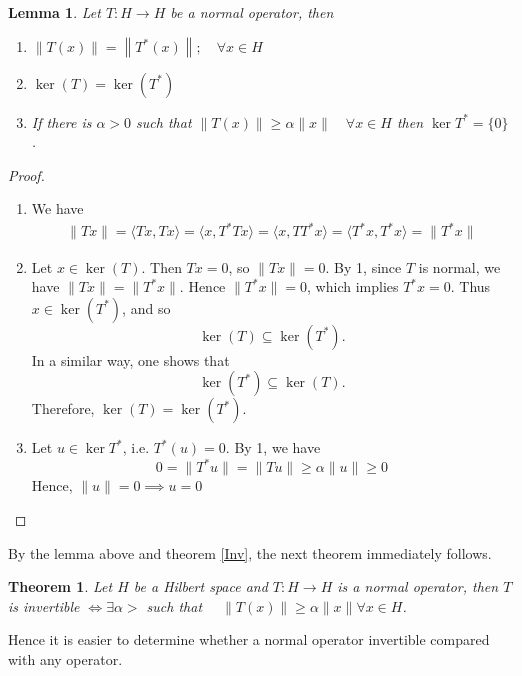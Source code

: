 \documentclass{report}
\newtheorem{thm}{Theorem}
\newtheorem{lem}{Lemma}
\begin{document}
\begin{lem}
Let $T: H \rightarrow H$ be a normal operator, then
  \begin{enumerate}
    \item $\|T(x)\|=\left\|T^{*}(x)\right\| ; \quad \forall x \in H$
    \item $\ker(T)=\ker(T^*)$
    \item If there is $\alpha>0$ such that $\|T(x)\| \geqslant \alpha\|x\| \quad \forall x \in H$ then $\operatorname{ker} T^{*}=\{0\}$.
  \end{enumerate}
\end{lem}
\begin{proof}
  \begin{enumerate}
    \item We have
      $$
      \begin{aligned}
        \lVert Tx\rVert = \langle Tx,Tx\rangle = \langle x,T^{*}Tx\rangle = \langle x,TT^{*}x\rangle = \langle T^{*}x,T^{*}x\rangle = \lVert T^{*}x\rVert
      \end{aligned}
      $$
    \item Let $x\in \ker(T)$. Then $Tx=0$, so $\|Tx\|=0$. By 1, since $T$ is normal, we have
      $
      \|Tx\|=\|T^*x\|.
      $
      Hence $\|T^*x\|=0$, which implies $T^*x=0$. Thus $x\in \ker(T^*)$, and so
      \[
      \ker(T)\subseteq \ker(T^*).
      \]
      In a similar way, one shows that
      \[
      \ker(T^*)\subseteq \ker(T).
      \]
      Therefore,
      $
      \ker(T)=\ker(T^*).
      $ 
    \item Let $u\in\operatorname{ker}T^{*}$, i.e. $T^{*}(u)=0$. By 1, we have
      $$
      0=\lVert T^{*}u\rVert=\lVert Tu\rVert\geq\alpha\lVert u\rVert\geq 0
      $$
      Hence, $\lVert u\rVert=0\implies u=0$
  \end{enumerate}
\end{proof}

By the lemma above and theorem \ref{Inv}, the next theorem immediately follows.

\begin{thm}
Let $H$ be a Hilbert space and $T: H \rightarrow H$ is a normal operator, then
$T$ is invertible $\Longleftrightarrow \exists \alpha>$ such that $\quad\|T(x)\| \geqslant \alpha\|x\| \forall x \in H$.
\end{thm}

Hence it is easier to determine whether a normal operator invertible compared with any operator.
\end{document}
